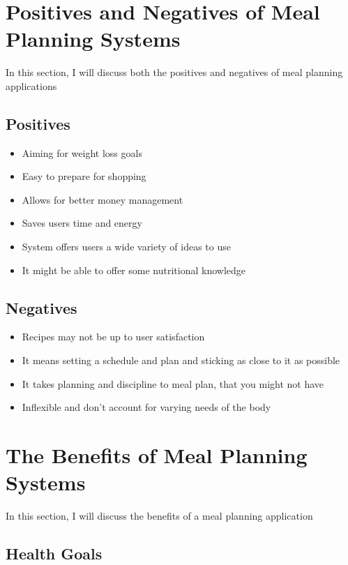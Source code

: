 \section{Positives and Negatives of Meal Planning Systems}

In this section, I will discuss both the positives and negatives of meal planning applications

\subsection{Positives}

\begin{itemize}
\item Aiming for weight loss goals
\item Easy to prepare for shopping
\item Allows for better money management
\item Saves users time and energy
\item System offers users a wide variety of ideas to use
\item It might be able to offer some nutritional knowledge
\end{itemize}

\subsection{Negatives}

\begin{itemize}
\item Recipes may not be up to user satisfaction
\item It means setting a schedule and plan and sticking as close to it as possible
\item It takes planning and discipline to meal plan, that you might not have
\item Inflexible and don’t account for varying needs of the body
\end{itemize}

\section{The Benefits of Meal Planning Systems}

In this section, I will discuss the benefits of a meal planning application

\subsection{Health Goals}

